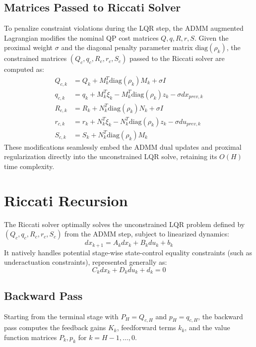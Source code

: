 \documentclass[11pt]{article}
\begin{document}
\subsection{Matrices Passed to Riccati Solver} \label{sec:constrained_matrices}
To penalize constraint violations during the LQR step, the ADMM augmented Lagrangian modifies the nominal QP cost matrices $Q, q, R, r, S$. Given the proximal weight $\sigma$ and the diagonal penalty parameter matrix $\text{diag}(\rho_k)$, the constrained matrices $(Q_c, q_c, R_c, r_c, S_c)$ passed to the Riccati solver are computed as:
\begin{align}
    Q_{c, k} &= Q_k + M_k^T \text{diag}(\rho_k) M_k + \sigma I \\
    q_{c, k} &= q_k + M_k^T \xi_k - M_k^T \text{diag}(\rho_k) z_k - \sigma dx_{prev, k} \\
    R_{c, k} &= R_k + N_k^T \text{diag}(\rho_k) N_k + \sigma I \\
    r_{c, k} &= r_k + N_k^T \xi_k - N_k^T \text{diag}(\rho_k) z_k - \sigma du_{prev, k} \\
    S_{c, k} &= S_k + N_k^T \text{diag}(\rho_k) M_k
\end{align}
These modifications seamlessly embed the ADMM dual updates and proximal regularization directly into the unconstrained LQR solve, retaining its $O(H)$ time complexity.

\section{Riccati Recursion}
The Riccati solver optimally solves the unconstrained LQR problem defined by $(Q_c, q_c, R_c, r_c, S_c)$ from the ADMM step, subject to linearized dynamics:
\begin{equation}
    dx_{k+1} = A_k dx_k + B_k du_k + b_k
\end{equation}
It natively handles potential stage-wise state-control equality constraints (such as underactuation constraints), represented generally as:
\begin{equation}
    C_k dx_k + D_k du_k + d_k = 0
\end{equation}

\subsection{Backward Pass}
Starting from the terminal stage with $P_H = Q_{c, H}$ and $p_H = q_{c, H}$, the backward pass computes the feedback gains $K_k$, feedforward terms $k_k$, and the value function matrices $P_k, p_k$ for $k = H-1, \dots, 0$.
\end{document}
